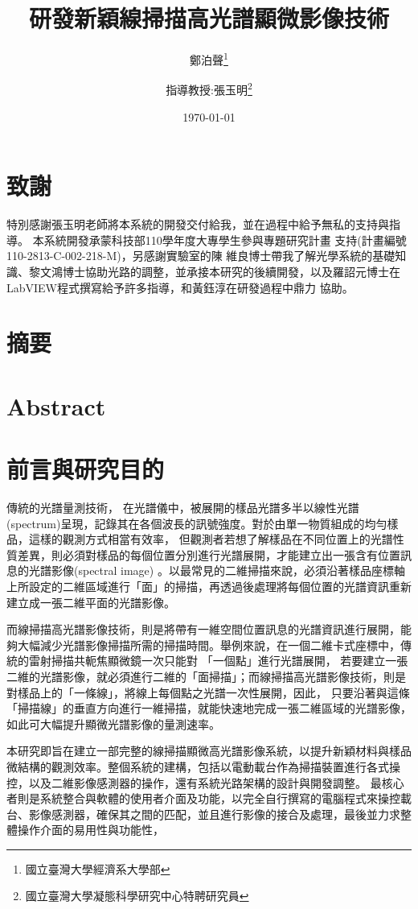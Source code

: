 \documentclass[12pt]{article}
\title{研發新穎線掃描高光譜顯微影像技術}
\author{鄭泊聲\thanks{國立臺灣大學經濟系大學部}
\and 指導教授:張玉明\thanks{國立臺灣大學凝態科學研究中心特聘研究員}}
\date{\today}
\begin{document}
\maketitle
\section*{致謝}
特別感謝張玉明老師將本系統的開發交付給我，並在過程中給予無私的支持與指導。
本系統開發承蒙科技部110學年度大專學生參與專題研究計畫
支持(計畫編號110-2813-C-002-218-M)，另感謝實驗室的陳
維良博士帶我了解光學系統的基礎知識、黎文鴻博士協助光路的調整，並承接本研究的後續開發，以及羅詔元博士在LabVIEW程式撰寫給予許多指導，和黃鈺淳在研發過程中鼎力
協助。
\section*{摘要}
\section*{Abstract}
\tableofcontents
\listoffigures
\listoftables
\section{前言與研究目的}
傳統的光譜量測技術，
在光譜儀中，被展開的樣品光譜多半以線性光譜(spectrum)呈現，記錄其在各個波長的訊號強度。對於由單一物質組成的均勻樣品，這樣的觀測方式相當有效率，
但觀測者若想了解樣品在不同位置上的光譜性質差異，則必須對樣品的每個位置分別進行光譜展開，才能建立出一張含有位置訊息的光譜影像(spectral image)
。以最常見的二維掃描來說，必須沿著樣品座標軸上所設定的二維區域進行「面」的掃描，再透過後處理將每個位置的光譜資訊重新建立成一張二維平面的光譜影像。

而線掃描高光譜影像技術，則是將帶有一維空間位置訊息的光譜資訊進行展開，能夠大幅減少光譜影像掃描所需的掃描時間。舉例來說，在一個二維卡式座標中，傳統的雷射掃描共軛焦顯微鏡一次只能對
「一個點」進行光譜展開，
若要建立一張二維的光譜影像，就必須進行二維的「面掃描」；而線掃描高光譜影像技術，則是對樣品上的「一條線」，將線上每個點之光譜一次性展開，因此，
只要沿著與這條「掃描線」的垂直方向進行一維掃描，就能快速地完成一張二維區域的光譜影像，如此可大幅提升顯微光譜影像的量測速率。

本研究即旨在建立一部完整的線掃描顯微高光譜影像系統，以提升新穎材料與樣品微結構的觀測效率。整個系統的建構，包括以電動載台作為掃描裝置進行各式操控，以及二維影像感測器的操作，還有系統光路架構的設計與開發調整。
最核心者則是系統整合與軟體的使用者介面及功能，以完全自行撰寫的電腦程式來操控載台、影像感測器，確保其之間的匹配，並且進行影像的接合及處理，最後並力求整體操作介面的易用性與功能性，
\end{document}

